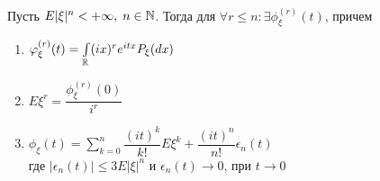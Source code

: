 \begin{theorem}[о производных х.ф.]~

  Пусть $E |\xi|^n < +\infty,\; n \in \mathbb{N}$. 
  Тогда для $\forall r \leq n: \exists \phi_{\xi}^{(r)}(t)$, причем

  \begin{enumerate}
    \item 
      $\varphi_{\xi}^{(r)} (t) = \int\limits_{\mathbb{R}} (i x)^r e^{i t x} P_{\xi} (dx)$

    \item
      $E \xi^r = \dfrac{\phi_{\xi}^{(r)} (0)}{i^r}$

    \item
      $
        \phi_{\xi} (t) 
        = \sum\limits_{k = 0}^{n} \dfrac{(i t)^k}{k!} E \xi^k + \dfrac{(i t)^n}{n!} \epsilon_n (t)
      $\\

      где $|\epsilon_n (t)| \leq 3 E |\xi|^n$ и $\epsilon_{n} (t) \to 0$, при $t \to 0$
  \end{enumerate}

\end{theorem}
  

